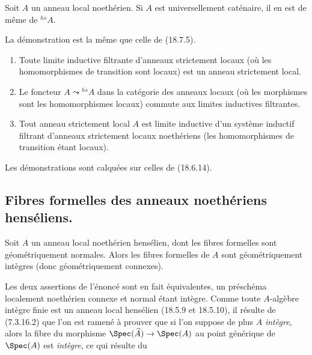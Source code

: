 
\begin{proposition}[18.8.17]
\label{IV.18.8.17}
Soit $A$ un anneau local noethérien. Si $A$ est universellement caténaire, il en est de même de ${}^{hs}\!A$.
\end{proposition}

La démonstration est la même que celle de (18.7.5).

\begin{proposition}[18.8.18]
\label{IV.18.8.18}
\begin{enumerate}
  \item[(i)] Toute limite inductive filtrante d'anneaux strictement locaux (où les homomorphismes de transition sont locaux) est un anneau strictement local.
  \item[(ii)] Le foncteur $A\leadsto{}^{hs}\!A$ dans la catégorie des anneaux locaux (où les morphismes sont les homomorphismes locaux) commute aux limites inductives filtrantes.
  \item[(iii)] Tout anneau strictement local $A$ est limite inductive d'un système inductif filtrant d'anneaux strictement locaux noethériens (les homomorphismes de transition étant locaux).
\end{enumerate}
\end{proposition}

Les démonstrations sont calquées sur celles de (18.6.14).

\subsection{Fibres formelles des anneaux noethériens henséliens.}

\begin{theorem}[18.9.1]
\label{IV.18.9.1}
Soit $A$ un anneau local noethérien hensélien, dont les fibres formelles sont géométriquement normales. Alors les fibres formelles de $A$ sont géométriquement intègres (donc géométriquement connexes).
\end{theorem}

Les deux assertions de l'énoncé sont en fait équivalentes, un préschéma localement noethérien connexe et normal étant intègre. Comme toute $A$-algèbre intègre finie est un anneau local hensélien (18.5.9 et 18.5.10), il résulte de (7.3.16.2) que l'on est ramené à prouver que si l'on suppose de plus $A$ \emph{intègre}, alors la fibre du morphisme $\Spec(\widehat A)\to\Spec(A)$ au point générique de $\Spec(A)$ est \emph{intègre}, ce qui résulte du

